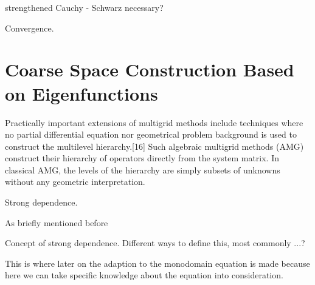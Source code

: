 \documentclass[../draft_1.tex]{subfiles}
\begin{document}
strengthened Cauchy - Schwarz necessary?


\begin{Theorem}
	Convergence.
\end{Theorem}

\section{Coarse Space Construction Based on Eigenfunctions}

Practically important extensions of multigrid methods include techniques where no partial differential equation nor geometrical problem background is used to construct the multilevel hierarchy.[16] Such algebraic multigrid methods (AMG) construct their hierarchy of operators directly from the system matrix. In classical AMG, the levels of the hierarchy are simply subsets of unknowns without any geometric interpretation.
\smallskip
\\
\begin{Definition}
	Strong dependence.
\end{Definition}

As briefly mentioned before 

Concept of strong dependence. Different ways to define this, most commonly ...? 

This is where later on the adaption to the monodomain equation is made because here we can take specific knowledge about the equation into consideration. 
\end{document}
